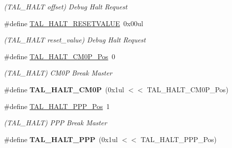 \begin{DoxyCompactItemize}
\begin{DoxyCompactList}\small\item\em (T\+A\+L\+\_\+\+H\+A\+L\+T offset) Debug Halt Request \end{DoxyCompactList}\item 
\hypertarget{group___s_a_m_l21___t_a_l_ga51e9a928dd6304d3097f03cb14dfa608}{}\#define \hyperlink{group___s_a_m_l21___t_a_l_ga51e9a928dd6304d3097f03cb14dfa608}{T\+A\+L\+\_\+\+H\+A\+L\+T\+\_\+\+R\+E\+S\+E\+T\+V\+A\+L\+U\+E}~0x00ul\label{group___s_a_m_l21___t_a_l_ga51e9a928dd6304d3097f03cb14dfa608}

\begin{DoxyCompactList}\small\item\em (T\+A\+L\+\_\+\+H\+A\+L\+T reset\+\_\+value) Debug Halt Request \end{DoxyCompactList}\item 
\hypertarget{group___s_a_m_l21___t_a_l_ga1e19e414654df3553b74e61138003d6c}{}\#define \hyperlink{group___s_a_m_l21___t_a_l_ga1e19e414654df3553b74e61138003d6c}{T\+A\+L\+\_\+\+H\+A\+L\+T\+\_\+\+C\+M0\+P\+\_\+\+Pos}~0\label{group___s_a_m_l21___t_a_l_ga1e19e414654df3553b74e61138003d6c}

\begin{DoxyCompactList}\small\item\em (T\+A\+L\+\_\+\+H\+A\+L\+T) C\+M0\+P Break Master \end{DoxyCompactList}\item 
\hypertarget{group___s_a_m_l21___t_a_l_ga93a2572601d2f73ef170308e2fae304f}{}\#define {\bfseries T\+A\+L\+\_\+\+H\+A\+L\+T\+\_\+\+C\+M0\+P}~(0x1ul $<$$<$ T\+A\+L\+\_\+\+H\+A\+L\+T\+\_\+\+C\+M0\+P\+\_\+\+Pos)\label{group___s_a_m_l21___t_a_l_ga93a2572601d2f73ef170308e2fae304f}

\item 
\hypertarget{group___s_a_m_l21___t_a_l_ga0d26645177cdba645f474ca184f2dc0f}{}\#define \hyperlink{group___s_a_m_l21___t_a_l_ga0d26645177cdba645f474ca184f2dc0f}{T\+A\+L\+\_\+\+H\+A\+L\+T\+\_\+\+P\+P\+P\+\_\+\+Pos}~1\label{group___s_a_m_l21___t_a_l_ga0d26645177cdba645f474ca184f2dc0f}

\begin{DoxyCompactList}\small\item\em (T\+A\+L\+\_\+\+H\+A\+L\+T) P\+P\+P Break Master \end{DoxyCompactList}\item 
\hypertarget{group___s_a_m_l21___t_a_l_ga20a43f675f4aaa24b67f0f47c6a6fd75}{}\#define {\bfseries T\+A\+L\+\_\+\+H\+A\+L\+T\+\_\+\+P\+P\+P}~(0x1ul $<$$<$ T\+A\+L\+\_\+\+H\+A\+L\+T\+\_\+\+P\+P\+P\+\_\+\+Pos)\label{group___s_a_m_l21___t_a_l_ga20a43f675f4aaa24b67f0f47c6a6fd75}


\end{DoxyCompactItemize}
